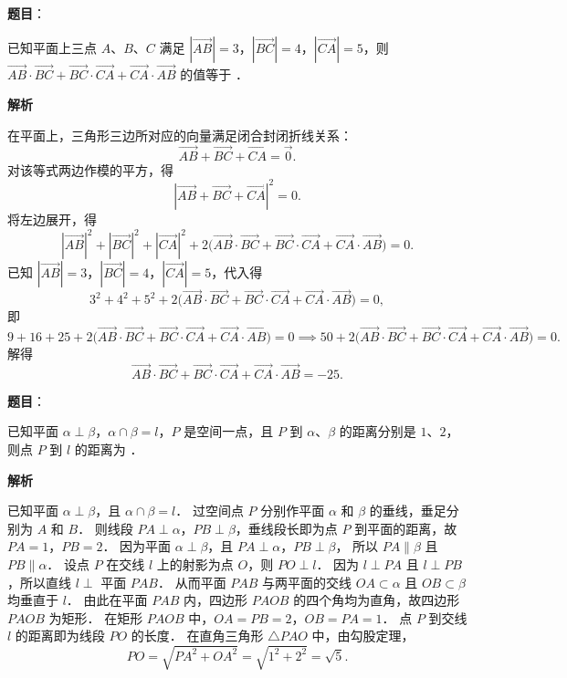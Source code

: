 \begin{answer}

\textbf{题目}：

已知平面上三点 $A$、$B$、$C$ 满足 $|\vec{AB}| = 3$，$|\vec{BC}| = 4$，$|\vec{CA}| = 5$，则 $\vec{AB} \cdot \vec{BC} + \vec{BC} \cdot \vec{CA} + \vec{CA} \cdot \vec{AB}$ 的值等于 \underline{\hspace{3cm}}．

\textbf{解析}

在平面上，三角形三边所对应的向量满足闭合封闭折线关系：
\nopagebreak[4]
\[
\vec{AB} + \vec{BC} + \vec{CA} = \vec{0}.
\]
对该等式两边作模的平方，得
\nopagebreak[4]
\[
|\vec{AB} + \vec{BC} + \vec{CA}|^2 = 0.
\]
将左边展开，得
\nopagebreak[4]
\[
|\vec{AB}|^2 + |\vec{BC}|^2 + |\vec{CA}|^2 + 2\big(\vec{AB} \cdot \vec{BC} + \vec{BC} \cdot \vec{CA} + \vec{CA} \cdot \vec{AB}\big) = 0.
\]
已知 $|\vec{AB}| = 3$，$|\vec{BC}| = 4$，$|\vec{CA}| = 5$，代入得
\nopagebreak[4]
\[
3^2 + 4^2 + 5^2 + 2\big(\vec{AB} \cdot \vec{BC} + \vec{BC} \cdot \vec{CA} + \vec{CA} \cdot \vec{AB}\big) = 0,
\]
即
\nopagebreak[4]
\[
9 + 16 + 25 + 2\big(\vec{AB} \cdot \vec{BC} + \vec{BC} \cdot \vec{CA} + \vec{CA} \cdot \vec{AB}\big) = 0 \implies 50 + 2\big(\vec{AB} \cdot \vec{BC} + \vec{BC} \cdot \vec{CA} + \vec{CA} \cdot \vec{AB}\big) = 0.
\]
解得
\nopagebreak[4]
\[
\vec{AB} \cdot \vec{BC} + \vec{BC} \cdot \vec{CA} + \vec{CA} \cdot \vec{AB} = -25.
\]


\end{answer}
\begin{answer}

\textbf{题目}：

已知平面 $\alpha \perp \beta$，$\alpha \cap \beta = l$，$P$ 是空间一点，且 $P$ 到 $\alpha$、$\beta$ 的距离分别是 $1$、$2$，则点 $P$ 到 $l$ 的距离为 \underline{\hspace{3cm}}．

\textbf{解析}

已知平面 $\alpha \perp \beta$，且 $\alpha \cap \beta = l$．
过空间点 $P$ 分别作平面 $\alpha$ 和 $\beta$ 的垂线，垂足分别为 $A$ 和 $B$．
则线段 $PA \perp \alpha$，$PB \perp \beta$，垂线段长即为点 $P$ 到平面的距离，故 $PA = 1$，$PB = 2$．
因为平面 $\alpha \perp \beta$，且 $PA \perp \alpha$，$PB \perp \beta$，
所以 $PA \parallel \beta$ 且 $PB \parallel \alpha$．
设点 $P$ 在交线 $l$ 上的射影为点 $O$，则 $PO \perp l$．
因为 $l \perp PA$ 且 $l \perp PB$，所以直线 $l \perp$ 平面 $PAB$．
从而平面 $PAB$ 与两平面的交线 $OA \subset \alpha$ 且 $OB \subset \beta$ 均垂直于 $l$．
由此在平面 $PAB$ 内，四边形 $PAOB$ 的四个角均为直角，故四边形 $PAOB$ 为矩形．
在矩形 $PAOB$ 中，$OA = PB = 2$，$OB = PA = 1$．
点 $P$ 到交线 $l$ 的距离即为线段 $PO$ 的长度．
在直角三角形 $\triangle PAO$ 中，由勾股定理，
\nopagebreak[4]
\[
PO = \sqrt{PA^2 + OA^2} = \sqrt{1^2 + 2^2} = \sqrt{5}.
\]


\end{answer}
